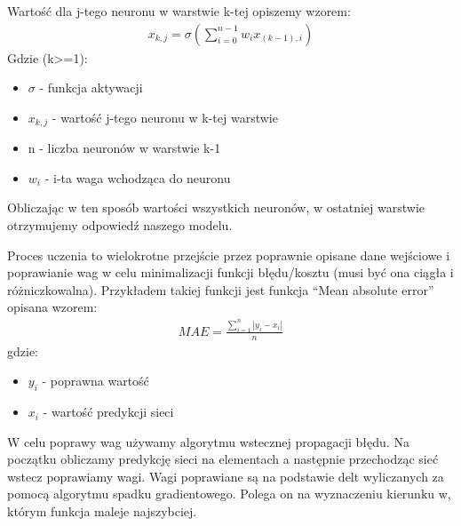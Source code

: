 \documentclass{article}
\begin{document}
Wartość dla j-tego neuronu w warstwie k-tej opiszemy wzorem:
\begin{align*}
    x_{k,j} = \sigma(\sum\limits_{i=0}^{n-1}{w_ix_{(k-1),i}})
\end{align*}
Gdzie (k>=1):
\begin{itemize}
    \item $\sigma$ - funkcja aktywacji
    \item $x_{k,j}$ - wartość j-tego neuronu w k-tej warstwie
    \item n - liczba neuronów w warstwie k-1
    \item $w_i$ - i-ta waga wchodząca do neuronu
\end{itemize}
Obliczając w ten sposób wartości wszystkich neuronów, w ostatniej warstwie otrzymujemy odpowiedź naszego modelu.

Proces uczenia to wielokrotne przejście przez poprawnie opisane dane wejściowe i poprawianie wag w celu minimalizacji funkcji błędu/kosztu (musi być ona ciągła i różniczkowalna).
Przykładem takiej funkcji jest funkcja ``Mean absolute error''\cite{mae-tf} opisana wzorem\cite{mae}:
\begin{align*}
    MAE=\frac{\sum\limits_{i=1}^{n}|{y_i - x_i}|}{n}
\end{align*}
gdzie:
\begin{itemize}
    \item $y_i$ - poprawna wartość
    \item $x_i$ - wartość predykcji sieci
\end{itemize}
W celu poprawy wag używamy algorytmu wstecznej propagacji błędu.
Na początku obliczamy predykcję sieci na elementach a następnie przechodząc sieć wstecz poprawiamy wagi.
Wagi poprawiane są na podstawie delt wyliczanych za pomocą algorytmu spadku gradientowego.
Polega on na wyznaczeniu kierunku w, którym funkcja maleje najszybciej.
\end{document}
